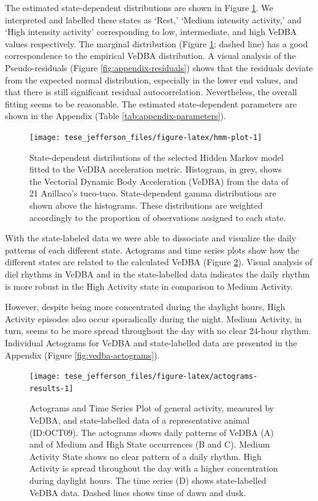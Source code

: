 \documentclass[english,msc,numbers,hidelinks]{coppe}
\begin{document}
  The estimated state-dependent distributions are shown in Figure \ref{fig:hmm-plot}. We interpreted and labelled these states as `Rest,' `Medium intensity activity,' and `High intensity activity' corresponding to low, intermediate, and high VeDBA values respectively. The marginal distribution (Figure \ref{fig:hmm-plot}; dashed line) has a good correspondence to the empirical VeDBA distribution. A visual analysis of the Pseudo-residuals (Figure \ref{fig:appendix-residuals}) shows that the residuals deviate from the expected normal distribution, especially in the lower end values, and that there is still significant residual autocorrelation. Nevertheless, the overall fitting seems to be reasonable. The estimated state-dependent parameters are shown in the Appendix (Table \ref{tab:appendix-parameters}). \newline
  \begin{figure}[H]

  {\centering \texttt{[image: tese\_jefferson\_files/figure-latex/hmm-plot-1]} 

  }

  \caption{State-dependent distributions of the selected Hidden Markov model fitted to the VeDBA acceleration metric. Histogram, in grey, shows the Vectorial Dynamic Body Acceleration (VeDBA) from the data of 21 Anillaco's tuco-tuco. State-dependent gamma distributions are shown above the histograms. These distributions are weighted accordingly to the proportion of observations assigned to each state.}\label{fig:hmm-plot}
  \end{figure}
  With the state-labeled data we were able to dissociate and visualize the daily patterns of each different state. Actograms and time series plots show how the different states are related to the calculated VeDBA (Figure \ref{fig:actograms-results}). Visual analysis of diel rhythms in VeDBA and in the state-labelled data indicates the daily rhythm is more robust in the High Activity state in comparison to Medium Activity.

  However, despite being more concentrated during the daylight hours, High Activity episodes also occur sporadically during the night. Medium Activity, in turn, seems to be more spread throughout the day with no clear 24-hour rhythm. Individual Actograms for VeDBA and state-labelled data are presented in the Appendix (Figure \ref{fig:vedba-actograms}). \newline
  \begin{figure}[H]

  {\centering \texttt{[image: tese\_jefferson\_files/figure-latex/actograms-results-1]} 

  }

  \caption{Actograms and Time Series Plot of general activity, measured by VeDBA, and state-labelled data of a representative animal (ID:OCT09). The actograms shows daily patterns of VeDBA (A) and of Medium and High State occurrences (B and C). Medium Activity State shows no clear pattern of a daily rhythm. High Activity is spread throughout the day with a higher concentration during daylight hours. The time series (D) shows state-labelled VeDBA data. Dashed lines shows time of dawn and dusk.}\label{fig:actograms-results}
  \end{figure}
  \clearpage
\end{document}
